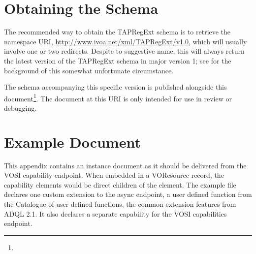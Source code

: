\documentclass{ivoa}
\begin{document}
\appendix


\section{Obtaining the Schema}

\label{app:fullschema}

The recommended way to obtain the TAPRegExt schema is to retrieve the
namespace URI, \url{http://www.ivoa.net/xml/TAPRegExt/v1.0}, which will
usually involve one or two redirects.  Despite to suggestive name, this
will always return the latest version of the TAPRegExt schema in major
version 1; see \citet{2018ivoa.spec.0529H} for the background of this
somewhat unfortunate circumstance.

The schema accompanying this specific version is published alongside this
document\footnote{}.  The document at
this URI is only intended for use in review or debugging.

\section{Example Document}

\label{app:example}

This appendix contains an instance document as it should be 
delivered from the VOSI capability endpoint. When embedded in a
VOResource record, the capability elements would be direct children of
the  element.  The example file declares one custom
extension to the async endpoint, a user defined function from the
Catalogue of user defined functions, the common extension features from
ADQL 2.1.  It also declares a separate capability for the VOSI
capabilities endpoint.
\end{document}
